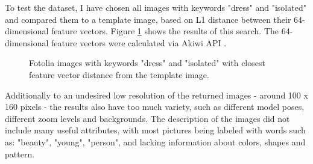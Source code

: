 \documentclass{article}
\begin{document}
To test the dataset, I have chosen all images with keywords "dress" and "isolated" and compared them to a template image, based on L1 distance between their 64-dimensional feature vectors. Figure \ref{fig:fotolia} shows the results of this search. The 64-dimensional feature vectors were calculated via Akiwi API \cite{sonnenberg_akiwi_nodate}.

\begin{figure}[h]
\centering
{}\hspace{1cm}
\caption{\label{fig:fotolia} Fotolia images with keywords "dress" and "isolated" with closest feature vector distance from the template image.}
\end{figure}


Additionally to an undesired low resolution of the returned images - around 100 x 160 pixels - the results also have too much variety, such as different model poses, different zoom levels and backgrounds. The description of the images did not include many useful attributes, with most pictures being labeled with words such as: "beauty", "young", "person", and lacking information about colors, shapes and pattern.
\end{document}
